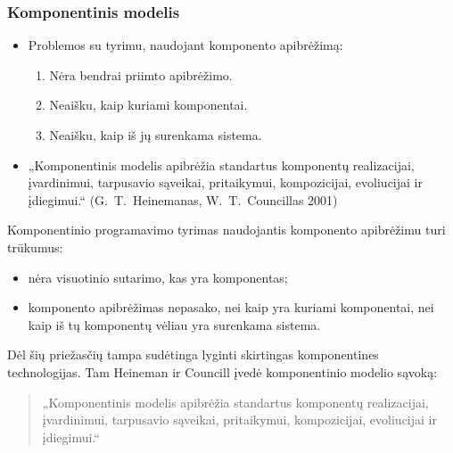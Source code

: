 \begin{frame}
  \frametitle{Komponentinis modelis}
  \begin{itemize}
    \item Problemos su tyrimu, naudojant komponento apibrėžimą:
      \begin{enumerate}
        \item Nėra bendrai priimto apibrėžimo.
        \item Neaišku, kaip kuriami komponentai.
        \item Neaišku, kaip iš jų surenkama sistema.
      \end{enumerate}
    \item „Komponentinis modelis apibrėžia standartus komponentų
      realizacijai, įvardinimui, tarpusavio sąveikai, pritaikymui,
      kompozicijai, evoliucijai ir įdiegimui.“ (\mbox{G. T. Heinemanas},
      \mbox{W. T. Councillas} 2001)
  \end{itemize}
  \begin{handout}
    Komponentinio programavimo tyrimas naudojantis komponento apibrėžimu
    turi trūkumus:
    \begin{itemize}
      \item nėra visuotinio sutarimo, kas yra komponentas;
      \item komponento apibrėžimas nepasako, nei kaip yra kuriami
        komponentai, nei kaip iš tų komponentų vėliau yra surenkama
        sistema.
    \end{itemize}
    Dėl šių priežasčių tampa sudėtinga lyginti skirtingas
    komponentines technologijas. Tam Heineman ir Councill įvedė
    komponentinio modelio sąvoką:
    \begin{quote}
      „Komponentinis modelis apibrėžia standartus komponentų
      realizacijai, įvardinimui, tarpusavio sąveikai, pritaikymui,
      kompozicijai, evoliucijai ir įdiegimui.“
    \end{quote}
  \end{handout}
\end{frame}

